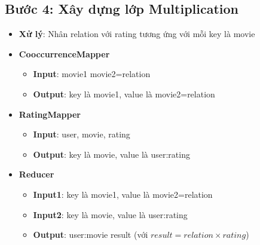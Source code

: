 \subsection*{Bước 4: Xây dựng lớp Multiplication}
\begin{itemize}
    \item \textbf{Xử lý}: Nhân relation với rating tương ứng với mỗi key là movie
    \item \textbf{CooccurrenceMapper}
          \begin{itemize}
              \item \textbf{Input}: movie1 \quad movie2=relation \\
              \item \textbf{Output}: key là movie1, value là movie2=relation \\
          \end{itemize}
    \item \textbf{RatingMapper}
          \begin{itemize}
              \item \textbf{Input}: user, movie, rating \\
              \item \textbf{Output}: key là movie, value là user:rating \\
          \end{itemize}
    \item \textbf{Reducer}
          \begin{itemize}
              \item \textbf{Input1}: key là movie1, value là movie2=relation \\
              \item \textbf{Input2}: key là movie, value là user:rating \\
              \item \textbf{Output}: user:movie \quad result (với $result = relation \times rating$) \\
          \end{itemize}
\end{itemize}
